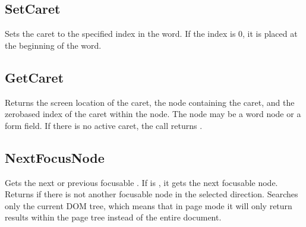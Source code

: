 \documentclass[letterpaper,12pt,english,openany,oneside]{sphinxmanual}
\begin{document}
\subsection{SetCaret}
\label{\detokenize{Access_DOM:setcaret}}
Sets the caret to the specified index in the word. If the index is 0, it is placed at the beginning of the word.

\begin{sphinxVerbatim}[commandchars=\\\{\}]
 
 
 
\end{sphinxVerbatim}


\subsection{GetCaret}
\label{\detokenize{Access_DOM:getcaret}}
Returns the screen location of the caret, the node containing the caret, and the zero\sphinxhyphen{}based index of the caret within the node. The node may be a word node or a form field. If there is no active caret, the call returns  .

\begin{sphinxVerbatim}[commandchars=\\\{\}]
 
 
 
 
 
 
 
\end{sphinxVerbatim}


\subsection{NextFocusNode}
\label{\detokenize{Access_DOM:nextfocusnode}}
Gets the next or previous focusable  . If  is  , it gets the next focusable node. Returns  if there is not another focusable node in the selected direction. Searches only the current DOM tree, which means that in page mode it will only return results within the page tree instead of the entire document.
\end{document}
